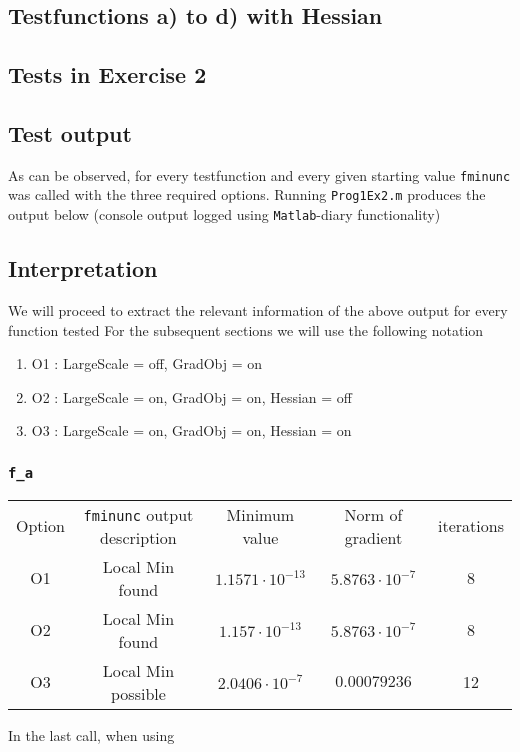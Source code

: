 \documentclass{article}
\begin{document}
	\subsection{Testfunctions a) to d) with Hessian}
	
	
	
	
	
	\subsection{Tests in Exercise 2}
	
    \subsection{Test output}
    As can be observed, for every testfunction and every given starting value \texttt{fminunc} was called with the three required options.
    Running \texttt{Prog1Ex2.m} produces the output below (console output logged using \texttt{Matlab}-diary functionality)
    
    
	
	\subsection{Interpretation}
    
    We will proceed to extract the relevant information of the above output for every function tested
    For the subsequent sections we will use the following notation
    \begin{enumerate}
        \item O1 : LargeScale = off, GradObj = on
        \item O2 : LargeScale = on, GradObj = on, Hessian = off
        \item O3 : LargeScale = on, GradObj = on, Hessian = on
    \end{enumerate}
    \subsubsection{\texttt{f\_a}}
    \begin{center}
    \begin{tabular}{c|c|c|c|c}
    \hline
    Option&\texttt{fminunc} output description&Minimum value&Norm of gradient&iterations\\
    O1&Local Min found&$1.1571 \cdot 10^{-13}$&$5.8763 \cdot 10^{-7}$&8\\
    O2&Local Min found&$1.157 \cdot10^{-13}$&$5.8763 \cdot10^{-7}$&8\\
    O3&Local Min possible&$2.0406\cdot10^{-7}$&$0.00079236$&12\\
    \hline
    \end{tabular}
    \end{center}
    In the last call, when using
\end{document}
